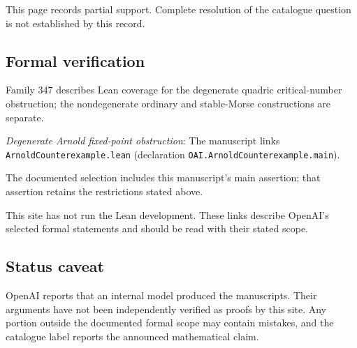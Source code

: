 \documentclass[11pt]{article}
\begin{document}
This page records partial support. Complete resolution of the catalogue question is not established by this record.

\subsection{Formal verification}
Family 347 describes Lean coverage for the degenerate quadric critical-number obstruction; the nondegenerate ordinary and stable-Morse constructions are separate.

\textit{Degenerate Arnold fixed-point obstruction}: The manuscript links \texttt{ArnoldCounterexample.lean} (declaration \texttt{OAI.ArnoldCounterexample.main}).

The documented selection includes this manuscript’s main assertion; that assertion retains the restrictions stated above.

This site has not run the Lean development. These links describe OpenAI’s selected formal statements and should be read with their stated scope.

\subsection{Status caveat}
OpenAI reports that an internal model produced the manuscripts. Their arguments have not been independently verified as proofs by this site. Any portion outside the documented formal scope may contain mistakes, and the catalogue label reports the announced mathematical claim.
\end{document}
